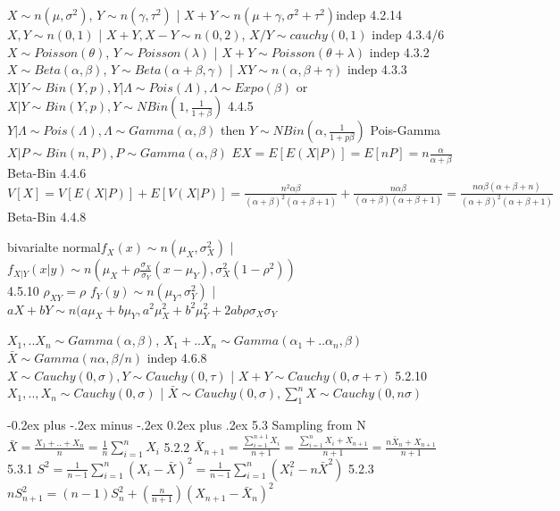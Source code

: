\documentclass[10pt,landscape]{article}
\makeatletter
\renewcommand{\subsection}{\@startsection{subsection}{2}{0mm}%
                                {-0.2ex plus -.2ex minus -.2ex}%
                                {0.2ex plus .2ex}%
                                {\normalfont\normalsize\bfseries}}
\makeatother
\begin{document}
\begin{multicols}{1}
$X\sim n(\mu,\sigma^2)$, $Y\sim n(\gamma,\tau^2)$ | $X+Y\sim n(\mu+\gamma,\sigma^2+\tau^2)$indep  4.2.14\\
$X, Y\sim n(0,1)$ | $X+Y, X-Y\sim n(0,2)$, $X/Y\sim cauchy(0,1)$ indep 4.3.4/6 \\
$X\sim Poisson(\theta)$, $Y\sim Poisson(\lambda)$ | $X+Y\sim Poisson(\theta+\lambda)$ indep 4.3.2 \\
$X\sim Beta(\alpha,\beta)$, $Y\sim Beta(\alpha+\beta,\gamma)$ | $XY\sim n(\alpha,\beta+\gamma)$ indep 4.3.3\\
$X|Y\sim Bin(Y,p), Y|\Lambda\sim Pois(\Lambda), \Lambda\sim Expo(\beta)$ or $X|Y\sim Bin(Y,p), Y\sim NBin(1,\frac1{1+\beta})$ 4.4.5\\
$Y|\Lambda\sim Pois(\Lambda), \Lambda\sim Gamma(\alpha,\beta)$ then $Y\sim NBin(\alpha,\frac1{1+p\beta})$ Pois-Gamma
$X|P\sim Bin(n,P), P\sim Gamma(\alpha,\beta)$ $EX=E[E(X|P)]=E[nP]=n\frac{\alpha}{\alpha+\beta}$ Beta-Bin 4.4.6
$V[X]=V[E(X|P)]+E[V(X|P)]=\frac{n^2\alpha\beta}{(\alpha+\beta)^2(\alpha+\beta+1)}+\frac{n\alpha\beta}{(\alpha+\beta)(\alpha+\beta+1)}=\frac{n\alpha\beta(\alpha+\beta+n)}{(\alpha+\beta)^2(\alpha+\beta+1)}$ Beta-Bin 4.4.8 

bivarialte normal$f_X(x)\sim n(\mu_X,\sigma^2_X)$ | $f_{X|Y}(x|y) \sim n\left(\mu_X+\rho\frac{\sigma_X}{\sigma_Y}(x-\mu_Y),\sigma_X^2(1-\rho^2)\right)$\\
4.5.10 $\rho_{XY}=\rho$ $f_Y(y)\sim n(\mu_Y,\sigma^2_Y)$ | $aX+bY\sim n(a\mu_X+b\mu_Y,a^2\mu_X^2+b^2\mu_Y^2+2ab\rho\sigma_X\sigma_Y$

$X_1,..X_n\sim Gamma(\alpha,\beta)$, $X_1+..X_n\sim Gamma(\alpha_1+..\alpha_n,\beta)$ $\bar X\sim Gamma(n\alpha,\beta/n)$ indep 4.6.8\\
$X\sim Cauchy(0,\sigma), Y\sim Cauchy(0,\tau)$ | $X+Y\sim Cauchy(0,\sigma+\tau)$ 5.2.10\\
$X_1,..,X_n\sim Cauchy(0,\sigma)$ | $\bar X\sim Cauchy(0,\sigma),\sum_{1}^{n} X\sim Cauchy(0,n\sigma)$

\subsection{5.3 Sampling from N}
$\bar X=\frac{X_1+..+X_n}{n}=\frac1n\sum_{i=1}^nX_i$ 5.2.2 $\bar X_{n+1}=\frac{\sum_{i=1}^{n+1}X_{i}}{n+1}=\frac{\sum_{i=1}^{n}X_{i}+X_{n+1}}{n+1}=\frac{n\bar X_{n}+X_{n+1}}{n+1}$ 5.3.1
$S^2=\frac1{n-1}\sum_{i=1}^n(X_i-\bar X)^2=\frac1{n-1}\sum_{i=1}^n(X_i^2-n\bar X^2)$ 5.2.3 $nS^2_{n+1}=(n-1)S_n^2+(\frac{n}{n+1})(X_{n+1}-\bar X_n)^2$


\end{multicols}
\end{document}

